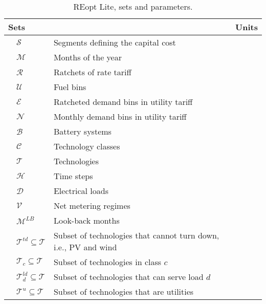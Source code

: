 \newcommand{\tfn}{\textsuperscript{*}}
\begin{longtable}{llll}
\caption{REopt Lite, sets and parameters.} \label{tab:param-set} \\
\multicolumn{3}{l}{\textbf{Sets}} & {\textbf{Units}} \\ \hline
&$\mathcal{S}$              & Segments defining the capital cost & \\
&$\mathcal{M}$              & Months of the year & \\
&$\mathcal{R}$              & Ratchets of rate tariff & \\
&$\mathcal{U}$              & Fuel bins & \\
&$\mathcal{E}$              & Ratcheted demand bins in utility tariff & \\
&$\mathcal{N}$              & Monthly demand bins in utility tariff & \\
&$\mathcal{B}$              & Battery systems & \\
&$\mathcal{C}$              & Technology classes & \\
&$\mathcal{T}$              & Technologies \\%
&$\mathcal{H}$              & Time steps & \\
&$\mathcal{D}$              & Electrical loads\\%
&$\mathcal{V}$              & Net metering regimes  & \\
&$\mathcal{M}^{LB}$         & Look-back months & \\
&$\mathcal{T}^{td} \subseteq \mathcal{T}$         & Subset of technologies that cannot turn down, i.e., PV and wind & \\
&$\mathcal{T}_c \subseteq \mathcal{T}$			& Subset of technologies in class $c$\\
&$\mathcal{T}^{ld}_d \subseteq \mathcal{T}$			& Subset of technologies that can serve load $d$\\
&$\mathcal{T}^{u} \subseteq \mathcal{T}$			& Subset of technologies that are utilities\\

\end{longtable}
